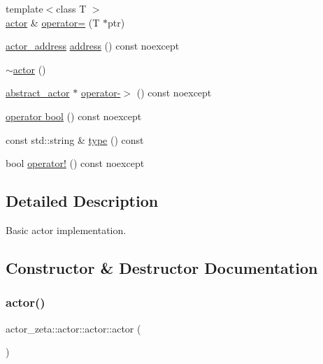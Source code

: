 \begin{DoxyCompactItemize}
\item 
{\footnotesize template$<$class T $>$ }\\\hyperlink{classactor__zeta_1_1actor_1_1actor}{actor} \& \hyperlink{classactor__zeta_1_1actor_1_1actor_a9573ab3ea73f292601ee7094ac63c37e}{operator=} (T $\ast$ptr)
\item 
\hyperlink{classactor__zeta_1_1actor_1_1actor__address}{actor\+\_\+address} \hyperlink{classactor__zeta_1_1actor_1_1actor_ad76c050fba9c3c212dd8ef7720012d91}{address} () const noexcept
\item 
\hyperlink{classactor__zeta_1_1actor_1_1actor_ac88a08ce8cb7657906aae1c63c010f8a}{$\sim$actor} ()
\item 
\hyperlink{classactor__zeta_1_1actor_1_1abstract__actor}{abstract\+\_\+actor} $\ast$ \hyperlink{classactor__zeta_1_1actor_1_1actor_a2321f0000f10f669cd60664bde0b7878}{operator-\/$>$} () const noexcept
\item 
\hyperlink{classactor__zeta_1_1actor_1_1actor_a0dd1822479e1f7793d113d93b08ac483}{operator bool} () const noexcept
\item 
const std\+::string \& \hyperlink{classactor__zeta_1_1actor_1_1actor_a6ea7c424ac30d951cd1a003d39e82755}{type} () const
\item 
bool \hyperlink{classactor__zeta_1_1actor_1_1actor_a161c252c7206ebb2a158cf552c098ec1}{operator!} () const noexcept
\end{DoxyCompactItemize}


\subsection{Detailed Description}
Basic actor implementation. 

\subsection{Constructor \& Destructor Documentation}
\mbox{\label{classactor__zeta_1_1actor_1_1actor_a7ec6ba681de874c0ffc40f81706387ab}} 
\subsubsection{\texorpdfstring{actor()}{actor()}\hspace{0.1cm}{\footnotesize\ttfamily [1/5]}}
{\footnotesize\ttfamily actor\+\_\+zeta\+::actor\+::actor\+::actor (\begin{DoxyParamCaption}{ }\end{DoxyParamCaption})\hspace{0.3cm}{\ttfamily [default]}}

